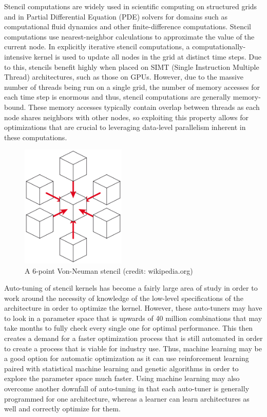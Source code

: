 \documentclass[conference]{IEEEtran}
\begin{document}
Stencil computations are widely used in scientific computing on structured grids and in Partial Differential Equation (PDE) solvers for
domains such as computational fluid dynamics and other finite-difference computations\cite{Mici, Nguy, Jaeger, Datta, Gana, Zhang, NVIDIA}. Stencil computations use nearest-neighbor calculations
to approximate the value of the current node. In explicitly iterative stencil computations, a computationally-intensive kernel is used to
update all nodes in the grid at distinct time steps. Due to this, stencils benefit highly when placed on SIMT (Single Instruction Multiple Thread)
architectures, such as those on GPUs. However, due to the massive number of threads being run on a single grid, the number of memory accesses for
each time step is enormous and thus, stencil computations are generally memory-bound. These memory accesses typically contain overlap between threads
as each node shares neighbors with other nodes, so exploiting this property allows for optimizations that are crucial to leveraging data-level
parallelism inherent in these computations\cite{Zhang}.

\begin{figure}[h]
	\centering
		\includegraphics[width=5cm]{stencil-7.png}
		\caption{A 6-point Von-Neuman stencil (credit: wikipedia.org)}
\end{figure}

Auto-tuning of stencil kernels has become a fairly large area of study in order to work around the necessity of knowledge of the low-level specifications
of the architecture in order to optimize the kernel. However, these auto-tuners may have to look in a parameter space that is upwards of 40 million
combinations that may take months to fully check every single one for optimal performance\cite{Datta}. This then creates a demand for a faster optimization
process that is still automated in order to create a process that is viable for industry use. Thus, machine learning may be a good option for automatic
optimization as it can use reinforcement learning paired with statistical machine learning and genetic algorithms in order to explore the parameter space
much faster. Using machine learning may also overcome another downfall of auto-tuning in that each auto-tuner is generally programmed for one architecture,
 whereas a learner can learn architectures as well and correctly optimize for them.
\end{document}
